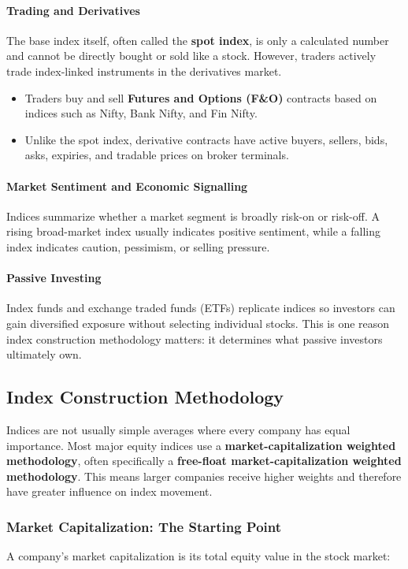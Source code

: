 \documentclass[12pt,openany]{book}
\begin{document}
\paragraph{Trading and Derivatives}
The base index itself, often called the \textbf{spot index}, is only a calculated number and cannot be directly bought or sold like a stock. However, traders actively trade index-linked instruments in the derivatives market.

\begin{itemize}[leftmargin=*]
    \item Traders buy and sell \textbf{Futures and Options (F\&O)} contracts based on indices such as Nifty, Bank Nifty, and Fin Nifty.
    \item Unlike the spot index, derivative contracts have active buyers, sellers, bids, asks, expiries, and tradable prices on broker terminals.
\end{itemize}

\paragraph{Market Sentiment and Economic Signalling}
Indices summarize whether a market segment is broadly risk-on or risk-off. A rising broad-market index usually indicates positive sentiment, while a falling index indicates caution, pessimism, or selling pressure.

\paragraph{Passive Investing}
Index funds and exchange traded funds (ETFs) replicate indices so investors can gain diversified exposure without selecting individual stocks. This is one reason index construction methodology matters: it determines what passive investors ultimately own.

\subsection{Index Construction Methodology}
Indices are not usually simple averages where every company has equal importance. Most major equity indices use a \textbf{market-capitalization weighted methodology}, often specifically a \textbf{free-float market-capitalization weighted methodology}. This means larger companies receive higher weights and therefore have greater influence on index movement.

\subsubsection{Market Capitalization: The Starting Point}
A company's market capitalization is its total equity value in the stock market:
\end{document}
